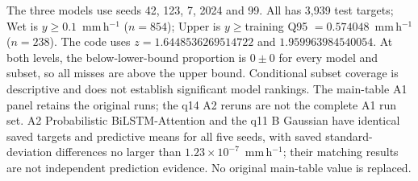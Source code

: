 {\color{red}\small The three models use seeds 42, 123, 7, 2024 and 99. All has 3,939 test targets; Wet is $y\geq0.1$~mm\,h$^{-1}$ ($n=854$); Upper is $y\geq$training Q95 $=0.574048$~mm\,h$^{-1}$ ($n=238$). The code uses $z=1.6448536269514722$ and $1.959963984540054$. At both levels, the below-lower-bound proportion is $0\pm0$ for every model and subset, so all misses are above the upper bound. Conditional subset coverage is descriptive and does not establish significant model rankings. The main-table A1 panel retains the original runs; the q14 A2 reruns are not the complete A1 run set. A2 Probabilistic BiLSTM-Attention and the q11 B Gaussian have identical saved targets and predictive means for all five seeds, with saved standard-deviation differences no larger than $1.23\times10^{-7}$~mm\,h$^{-1}$; their matching results are not independent prediction evidence. No original main-table value is replaced.
\par}
